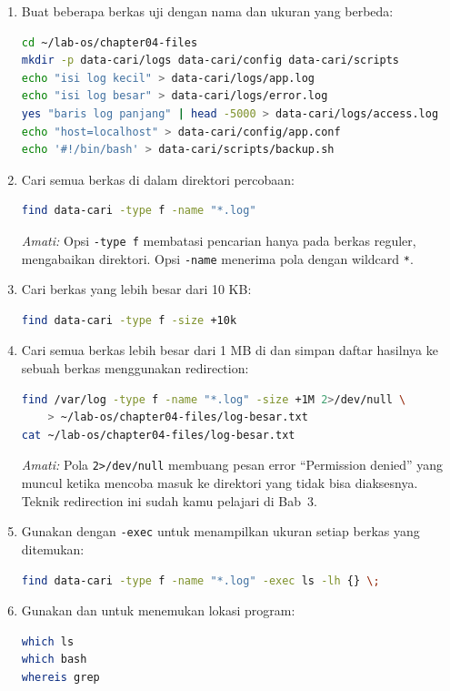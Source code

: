 \begin{enumerate}
    \item Buat beberapa berkas uji dengan nama dan ukuran yang berbeda:
\begin{lstlisting}[language=bash, caption={Membuat berkas uji untuk pencarian}]
cd ~/lab-os/chapter04-files
mkdir -p data-cari/logs data-cari/config data-cari/scripts
echo "isi log kecil" > data-cari/logs/app.log
echo "isi log besar" > data-cari/logs/error.log
yes "baris log panjang" | head -5000 > data-cari/logs/access.log
echo "host=localhost" > data-cari/config/app.conf
echo '#!/bin/bash' > data-cari/scripts/backup.sh
\end{lstlisting}

    \item Cari semua berkas  di dalam direktori percobaan:
\begin{lstlisting}[language=bash, caption={Mencari berkas berdasarkan nama}]
find data-cari -type f -name "*.log"
\end{lstlisting}
    \textit{Amati:} Opsi \texttt{-type f} membatasi pencarian hanya pada berkas reguler, mengabaikan direktori. Opsi \texttt{-name} menerima pola dengan wildcard \texttt{*}.

    \item Cari berkas yang lebih besar dari 10 KB:
\begin{lstlisting}[language=bash, caption={Mencari berkas berdasarkan ukuran}]
find data-cari -type f -size +10k
\end{lstlisting}

    \item Cari semua berkas  lebih besar dari 1 MB di 
    dan simpan daftar hasilnya ke sebuah berkas menggunakan redirection:
\begin{lstlisting}[language=bash, caption={Mencari log besar dan menyimpan hasil}]
find /var/log -type f -name "*.log" -size +1M 2>/dev/null \
    > ~/lab-os/chapter04-files/log-besar.txt
cat ~/lab-os/chapter04-files/log-besar.txt
\end{lstlisting}
    \textit{Amati:} Pola \texttt{2>/dev/null} membuang pesan error ``Permission denied'' yang muncul ketika  mencoba masuk ke direktori yang tidak bisa diaksesnya. Teknik redirection ini sudah kamu pelajari di Bab~3.

    \item Gunakan  dengan \texttt{-exec} untuk menampilkan ukuran setiap berkas yang ditemukan:
\begin{lstlisting}[language=bash, caption={Menjalankan perintah pada setiap berkas yang ditemukan}]
find data-cari -type f -name "*.log" -exec ls -lh {} \;
\end{lstlisting}

    \item Gunakan  dan  untuk menemukan lokasi program:
\begin{lstlisting}[language=bash, caption={Menemukan lokasi program}]
which ls
which bash
whereis grep
\end{lstlisting}
\end{enumerate}

